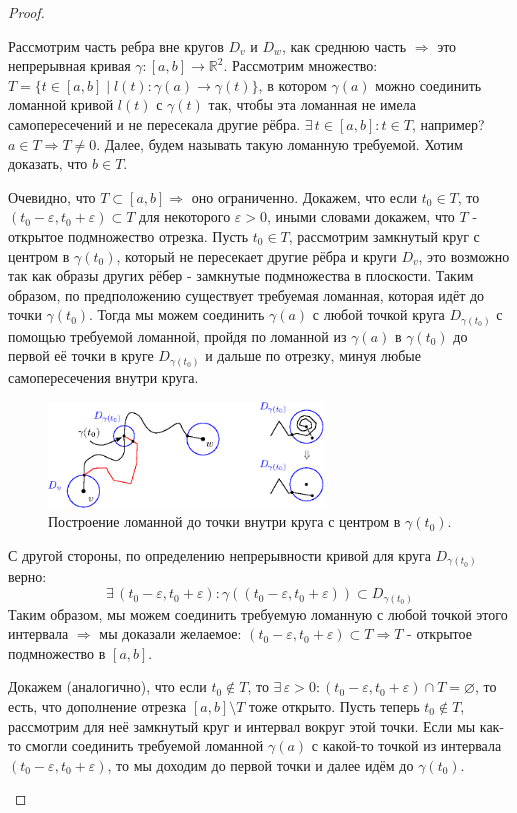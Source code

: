 \documentclass[12pt]{article}
\newcommand{\MR}{\mathbb{R}}
\newcommand{\VN}{\varnothing}
\newcommand{\VE}{\varepsilon}
\theoremstyle{definition}
\begin{document}
\begin{proof}
\begin{enumerate}[label ={\arabic*)}]
		Рассмотрим часть ребра вне кругов $D_v$ и $D_w$, как среднюю часть $\Rightarrow$ это непрерывная кривая $\gamma \colon [a,b] \to \MR^2$. Рассмотрим множество: $T = \{t \in[a,b] \mid l(t) \colon \gamma(a) \to \gamma(t)\}$, в котором $\gamma(a)$ можно соединить ломанной кривой $l(t)$ с $\gamma(t)$ так, чтобы эта ломанная не имела самопересечений и не пересекала другие рёбра. $\exists \, t \in [a,b] \colon t \in T$, например? $a \in T \Rightarrow T \neq 0$. Далее, будем называть такую ломанную требуемой. Хотим доказать, что $b \in T$. 
		
		Очевидно, что $T \subset [a,b] \Rightarrow$ оно ограниченно. Докажем, что если $t_0 \in T$, то $(t_0 - \VE, t_0 + \VE) \subset T$ для некоторого $\VE> 0$, иными словами докажем, что $T$ - открытое подмножество отрезка. Пусть $t_0 \in T$, рассмотрим замкнутый круг с центром в $\gamma(t_0)$, который не пересекает другие рёбра и круги $D_v$, это возможно так как образы других рёбер - замкнутые подмножества в плоскости. Таким образом, по предположению существует требуемая ломанная, которая идёт до точки $\gamma(t_0)$. Тогда мы можем соединить $\gamma(a)$ с любой точкой круга $D_{\gamma(t_0)}$ с помощью требуемой ломанной, пройдя по ломанной из $\gamma(a)$ в $\gamma(t_0)$ до первой её точки в круге $D_{\gamma(t_0)}$ и дальше по отрезку, минуя любые самопересечения внутри круга.
		\begin{figure}[H]
			\centering
			\includegraphics[width=0.65\textwidth]{GATL2_9.eps}
			\caption{Построение ломанной до точки внутри круга с центром в $\gamma(t_0)$.}
			\label{2_9}
		\end{figure}
		С другой стороны, по определению непрерывности кривой для круга $D_{\gamma(t_0)}$ верно:
		$$
			\exists \, (t_0 - \VE, t_0 + \VE) \colon \gamma((t_0 - \VE, t_0 + \VE)) \subset D_{\gamma(t_0)}
		$$
		Таким образом, мы можем соединить требуемую ломанную с любой точкой этого интервала $\Rightarrow$ мы доказали желаемое: $(t_0 - \VE, t_0 + \VE) \subset T \Rightarrow T$ - открытое подмножество в $[a,b]$.
		
		Докажем (аналогично), что если $t_0 \not\in T$, то $\exists \, \VE > 0 \colon (t_0 - \VE, t_0 + \VE)\cap T = \VN$, то есть, что дополнение отрезка $[a,b]\setminus T$ тоже открыто. Пусть теперь $t_0 \not\in T$, рассмотрим для неё замкнутый круг и интервал вокруг этой точки. Если мы как-то смогли соединить требуемой ломанной $\gamma(a)$ с какой-то точкой из интервала $(t_0 - \VE, t_0 + \VE)$, то мы доходим до первой точки и далее идём до $\gamma(t_0)$.
		

\end{enumerate}
\end{proof}
\end{document}
